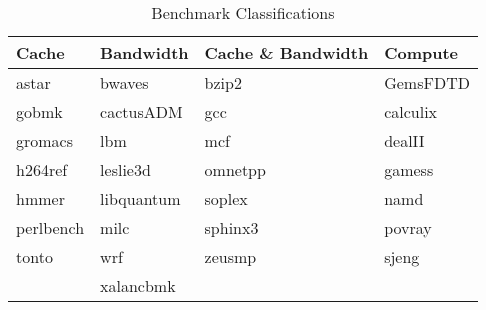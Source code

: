 \begin{table}[ht]
\centering
\begin{tabular}{llll}
\toprule
\bf{Cache} & \bf{Bandwidth} & \bf{Cache \& Bandwidth} & \bf{Compute} \\ \hline
astar	& bwaves	& bzip2	& GemsFDTD	\\ 
gobmk	& cactusADM	& gcc	& calculix	\\ 
gromacs	& lbm	& mcf	& dealII	\\ 
h264ref	& leslie3d	& omnetpp	& gamess	\\ 
hmmer	& libquantum	& soplex	& namd	\\ 
perlbench	& milc	& sphinx3	& povray	\\ 
tonto	& wrf	& zeusmp	& sjeng	\\ 
		& xalancbmk	& 		& 		\\ 
\bottomrule
\end{tabular}
\caption{Benchmark Classifications}
\label{tbl:benchmarks_workloads:benchmark_classification}
\end{table}
